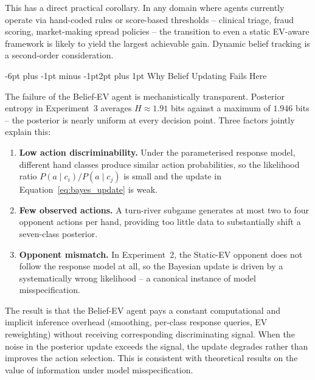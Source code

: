 \documentclass[12pt]{article}
\makeatletter
\renewcommand\subsection{\@startsection{subsection}{2}{\z@}%
  {-6pt plus -1pt minus -1pt}{2pt plus 1pt}%
  {\normalfont\normalsize\bfseries}}
\makeatother
\begin{document}
This has a direct practical corollary.
In any domain where agents currently operate via hand-coded rules
or score-based thresholds -- clinical triage\cite{obermeyer2016predicting},
fraud scoring\cite{dalpozzolo2015fraud}, market-making spread
policies\cite{glosten1985bid} -- the transition to even a static
EV-aware framework is likely to yield the largest achievable gain.
Dynamic belief tracking is a second-order consideration.

\subsection{Why Belief Updating Fails Here}

The failure of the Belief-EV agent is mechanistically transparent.
Posterior entropy in Experiment~3 averages $H\approx1.91$ bits
against a maximum of $1.946$ bits -- the posterior is nearly
uniform at every decision point.
Three factors jointly explain this:

\begin{enumerate}[leftmargin=*, itemsep=1pt, topsep=2pt]
  \item \textbf{Low action discriminability.}
    Under the parameterised response model, different hand classes
    produce similar action probabilities, so the likelihood ratio
    $P(a \mid c_i)/P(a \mid c_j)$ is small and the update in
    Equation~\ref{eq:bayes_update} is weak.
  \item \textbf{Few observed actions.}
    A turn-river subgame generates at most two to four
    opponent actions per hand, providing too little data to
    substantially shift a seven-class posterior\cite{murphy2012ml}.
  \item \textbf{Opponent mismatch.}
    In Experiment~2, the Static-EV opponent does not follow the
    response model at all, so the Bayesian update is driven by
    a systematically wrong likelihood -- a canonical instance of
    model misspecification\cite{gal2016dropout}.
\end{enumerate}

The result is that the Belief-EV agent pays a constant computational
and implicit inference overhead (smoothing, per-class response
queries, EV reweighting) without receiving corresponding
discriminating signal.
When the noise in the posterior update exceeds the signal, the
update degrades rather than improves the action selection.
This is consistent with theoretical results on the value of
information under model
misspecification\cite{gal2016dropout,albrecht2018survey}.
\end{document}
